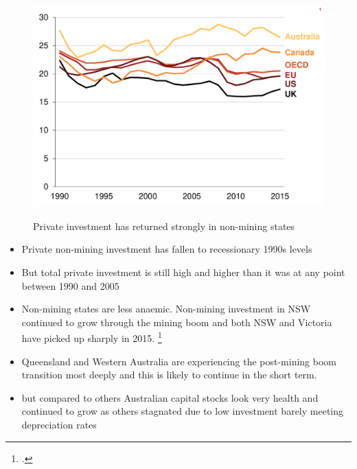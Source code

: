 \begin{figure}[p] 
 \caption{Private investment has returned strongly in non-mining states}
 \includegraphics[page=4]{atlas/Ch2.pdf}\label{fig:statesinvestment}

\end{figure}

\begin{itemize}
    \item Private non-mining investment has fallen to recessionary 1990s levels
    \item But total private investment is still high and higher than it was at any point between 1990 and 2005
    \item Non-mining states are less anaemic. Non-mining investment in NSW continued to grow through the mining boom and both NSW and Victoria have picked up sharply in 2015. \footcite{RBA2016}
    \item Queensland and Western Australia are experiencing the post-mining boom transition most deeply and this is likely to continue in the short term.
    \item but compared to others Australian capital stocks look very health and continued to grow as others stagnated due to low investment barely meeting depreciation rates
\end{itemize} 

